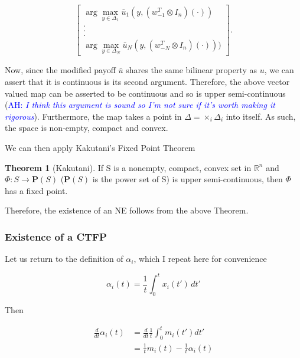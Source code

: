 \documentclass{article}
\theoremstyle{definition}
\newtheorem{theorem}{Theorem}
\newcommand{\ah}[1]{\textcolor{blue}{AH: \textit{#1}}}
\begin{document}
	
	\begin{equation}
		\begin{bmatrix}
			\arg\max_{y \in \Delta_1} \bar{u}_1(y, (w_{-1}^T \otimes I_n) ( \cdot )) \\ . \\ . \\ . \\ \arg\max_{y \in \Delta_N} \bar{u}_N(y, (w_{-N}^T \otimes I_n)( \cdot )))
		\end{bmatrix}	.
	\end{equation}
	

	Now, since the modified payoff $\bar{u}$ shares the same bilinear property as $u$, we can assert that it is continuous is its second argument. Therefore, the above vector valued map can be asserted to be continuous and so is upper semi-continuous (\ah{I think this argument is sound so I'm not sure if it's worth making it rigorous}). Furthermore, the map takes a point in $\Delta = \times_i \Delta_i$ into itself. As such, the space is non-empty, compact and convex. 
	
	We can then apply Kakutani's Fixed Point Theorem
	
	\begin{theorem}[Kakutani]
		If S is a nonempty, compact, convex set in $\mathbb{R}^n$ and $\Phi : S \rightarrow \textbf{P}(S)$ ($\textbf{P}(S)$ is the power set of S) is upper semi-continuous, then $\Phi$ has a fixed point.
	\end{theorem}

	Therefore, the existence of an NE follows from the above Theorem.

	\subsubsection*{Existence of a CTFP}
	
	Let us return to the definition of $\alpha_i$, which I repeat here for convenience
	
	\begin{equation*}
		\alpha_i(t) = \frac{1}{t} \int_{0}^{t} x_i(t') \, dt'
	\end{equation*}
	
	Then
	
	\begin{align}
		\frac{d}{dt} \alpha_i(t) & = \frac{d}{dt} \frac{1}{t} \int_{0}^t m_i(t') dt' \nonumber \\
		& = \frac{1}{t} m_i(t) - \frac{1}{t} \alpha_i(t)
	\end{align}
\end{document}
